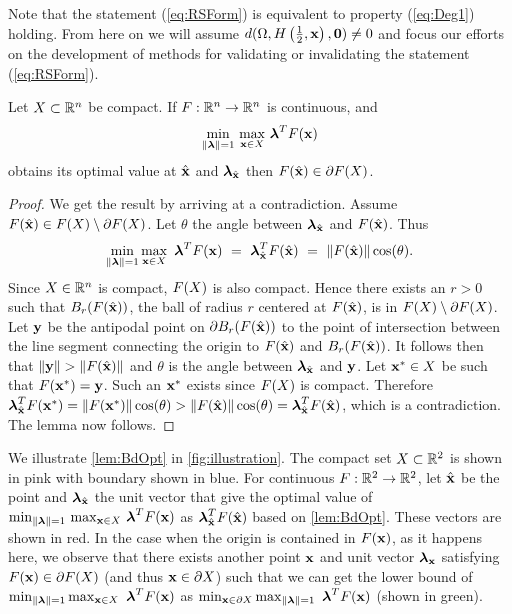 Note that the statement (\ref{eq:RSForm}) is equivalent to property (\ref{eq:Deg1}) holding.
From here on we will assume $d(\Omega,H\left(\frac{1}{2},\mathbf{x}\right),\mathbf{0})\neq 0$ and focus our efforts on the development of methods for validating or invalidating the statement (\ref{eq:RSForm}).

\begin{lem} 
  \label{lem:BdOpt}
  Let $X\subset\mathbb{R}^n$ be compact. If $F:\mathbb{R}^n\rightarrow\mathbb{R}^n$ is continuous, and 
  \[
  \min\limits_{\lVert\boldsymbol{\lambda}\rVert=1} \, \max\limits_{\mathbf{x}\in X} \, \boldsymbol{\lambda}^TF(\mathbf{x})
  \]
  obtains its optimal value at $\hat{\mathbf{x}}$ and $\boldsymbol{\lambda}_{\hat{\mathbf{x}}}$ then $F(\hat{\mathbf{x}})\in \partial F(X)$. 
\end{lem}

\begin{proof} 
  We get the result by arriving at a contradiction.
  Assume $F(\hat{\mathbf{x}})\in F(X)\setminus\partial F(X)$. 
  Let $\theta$ the angle between $\boldsymbol{\lambda}_{\hat{\mathbf{x}}}$ and $F(\hat{\mathbf{x}})$. 
  Thus
  \[
  \min\limits_{\lVert\boldsymbol{\lambda}\rVert=1}\max\limits_{\mathbf{x}\in X}\ \boldsymbol{\lambda}^TF(\mathbf{x}) ~=~ \boldsymbol{\lambda}_{\hat{\mathbf{x}}}^TF(\hat{\mathbf{x}}) ~=~ \lVert F(\hat{\mathbf{x}})\rVert\cos(\theta).
  \]
  Since $X\in\mathbb{R}^n$ is compact, $F(X)$ is also compact. 
  Hence there exists an $r>0$ such that  $B_r(F(\hat{\mathbf{x}}))$, the ball of radius $r$ centered at $F(\hat{\mathbf{x}})$, is in $F(X)\setminus\partial F(X)$. 
  Let $\mathbf{y}$ be the antipodal point on $\partial B_r(F(\hat{\mathbf{x}}))$ to the point of intersection between the line segment connecting the origin to $F(\hat{\mathbf{x}})$ and $B_r(F(\hat{\mathbf{x}}))$. 
  It follows then that $\lVert\mathbf{y}\rVert>\lVert F(\hat{\mathbf{x}})\rVert$ and $\theta$ is the angle between $\boldsymbol{\lambda}_{\hat{\mathbf{x}}}$ and $\mathbf{y}$.   
  Let $\mathbf{x}^*\in X$ be such that $F(\mathbf{x}^*)=\mathbf{y}$.
  Such an $\mathbf{x}^*$ exists since $F(X)$ is compact. 
  Therefore $\boldsymbol{\lambda}_{\hat{\mathbf{x}}}^TF(\mathbf{x}^*)=\lVert F(\mathbf{x}^*)\rVert \cos(\theta) > \lVert F(\hat{\mathbf{x}})\rVert \cos(\theta) = \boldsymbol{\lambda}_{\hat{\mathbf{x}}}^TF(\hat{\mathbf{x}})$, which is a contradiction. 
  The lemma now follows.
\end{proof}

We illustrate \cref{lem:BdOpt} in \cref{fig:illustration}.
The compact set $X\subset\mathbb{R}^2$ is shown in pink with boundary shown in blue.
For continuous $F:\mathbb{R}^2 \rightarrow \mathbb{R}^2$, let $\hat{\mathbf{x}}$ be the point and $\boldsymbol{\lambda}_{\hat{\mathbf{x}}}$ the unit vector that give the optimal value of $\min_{\lVert\boldsymbol{\lambda}\rVert=1} \, \max_{\mathbf{x}\in X} \, \boldsymbol{\lambda}^TF(\mathbf{x})$ as $\boldsymbol{\lambda}_{\hat{\mathbf{x}}}^TF(\hat{\mathbf{x}})$ based on \cref{lem:BdOpt}.
These vectors are shown in red.
In the case when the origin is contained in $F(\mathbf{x})$, as it happens here, we observe that there exists another point $\mathbf{x}$ and unit vector $\boldsymbol{\lambda}_{\mathbf{x}}$ satisfying $F(\mathbf{x}) \in \partial F(X)$ (and thus $\mathbf{x}\in \partial X$) such that we can get the lower bound of $\min_{\norm{\vlambda}=1}\max_{\vx\in X}\ \vlambda^T\vF(\vx)$ as $\min_{\mathbf{x}\in \partial X} \max_{\lVert\boldsymbol{\lambda}\rVert=1}\ \boldsymbol{\lambda}^TF(\mathbf{x})$ (shown in green).


